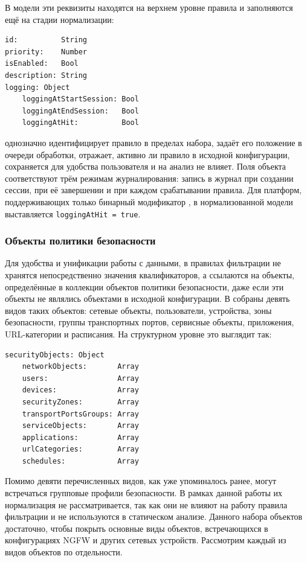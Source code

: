 В модели эти реквизиты находятся на верхнем уровне правила и заполняются ещё на стадии нормализации:

\begin{lstlisting}[style=schemastyle]
id:          String
priority:    Number
isEnabled:   Bool
description: String
logging: Object
    loggingAtStartSession: Bool
    loggingAtEndSession:   Bool
    loggingAtHit:          Bool
\end{lstlisting}

 однозначно идентифицирует правило в пределах набора,  задаёт его положение в очереди обработки,  отражает, активно ли правило в исходной конфигурации,  сохраняется для удобства пользователя и на анализ не влияет. Поля объекта  соответствуют трём режимам журналирования: запись в журнал при создании сессии, при её завершении и при каждом срабатывании правила. Для платформ, поддерживающих только бинарный модификатор , в нормализованной модели выставляется \texttt{loggingAtHit = true}.

\subsubsection{Объекты политики безопасности}
\label{sec:Section3:objects}

Для удобства и унификации работы с данными, в правилах фильтрации не хранятся непосредственно значения квалификаторов, а ссылаются на объекты, определённые в коллекции объектов политики безопасности, даже если эти объекты не являлись объектами в исходной конфигурации. В  собраны девять видов таких объектов: сетевые объекты, пользователи, устройства, зоны безопасности, группы транспортных портов, сервисные объекты, приложения, URL-категории и расписания. На структурном уровне это выглядит так:

\begin{lstlisting}[style=schemastyle]
securityObjects: Object
    networkObjects:       Array
    users:                Array
    devices:              Array
    securityZones:        Array
    transportPortsGroups: Array
    serviceObjects:       Array
    applications:         Array
    urlCategories:        Array
    schedules:            Array
\end{lstlisting}

Помимо девяти перечисленных видов, как уже упоминалось ранее, могут встречаться групповые профили безопасности. В рамках данной работы их нормализация не рассматривается, так как они не влияют на работу правила фильтрации и не используются в статическом анализе. Данного набора объектов достаточно, чтобы покрыть основные виды объектов, встречающихся в конфигурациях NGFW и других сетевых устройств. Рассмотрим каждый из видов объектов по отдельности.

